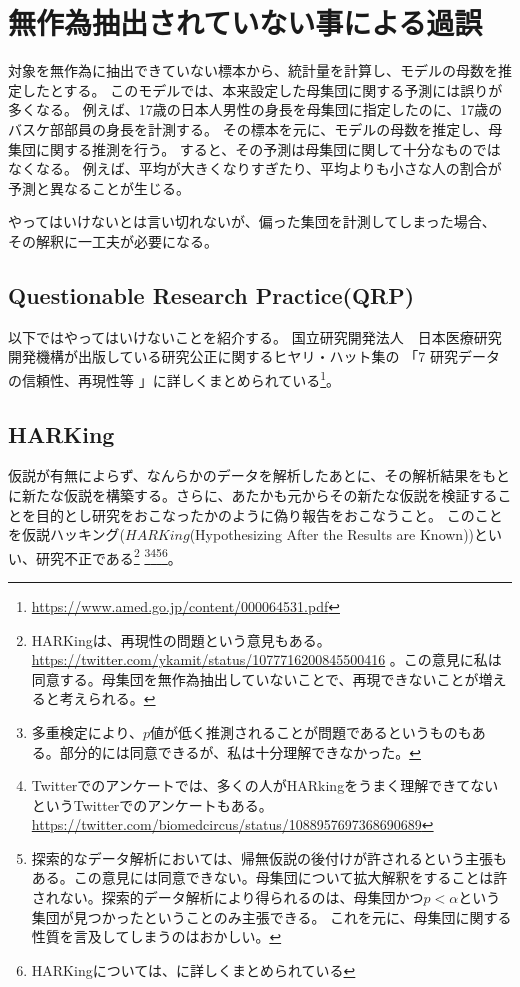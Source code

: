 \section{無作為抽出されていない事による過誤}
対象を無作為に抽出できていない標本から、統計量を計算し、モデルの母数を推定したとする。
このモデルでは、本来設定した母集団に関する予測には誤りが多くなる。
例えば、17歳の日本人男性の身長を母集団に指定したのに、17歳のバスケ部部員の身長を計測する。
その標本を元に、モデルの母数を推定し、母集団に関する推測を行う。
すると、その予測は母集団に関して十分なものではなくなる。
例えば、平均が大きくなりすぎたり、平均よりも小さな人の割合が予測と異なることが生じる。

やってはいけないとは言い切れないが、偏った集団を計測してしまった場合、
その解釈に一工夫が必要になる。


\subsection{Questionable Research Practice(QRP)}
以下ではやってはいけないことを紹介する。
国立研究開発法人　日本医療研究開発機構が出版している研究公正に関するヒヤリ・ハット集の
「7 研究データの信頼性、再現性等 」に詳しくまとめられている\footnote{\url{https://www.amed.go.jp/content/000064531.pdf}}。
\subsection{HARKing}
仮説が有無によらず、なんらかのデータを解析したあとに、その解析結果をもとに新たな仮説を構築する。さらに、あたかも元からその新たな仮説を検証することを目的とし研究をおこなったかのように偽り報告をおこなうこと。
このことを仮説ハッキング($HARKing$(Hypothesizing After the Results are Known))といい、研究不正である\footnote{
    HARKingは、再現性の問題という意見もある。
    \url{https://twitter.com/ykamit/status/1077716200845500416} 。この意見に私は同意する。母集団を無作為抽出していないことで、再現できないことが増えると考えられる。
}
\footnote{
    多重検定により、$p$値が低く推測されることが問題であるというものもある\cite{池田_功毅2016,中村_大輝2021sp20016}。部分的には同意できるが、私は十分理解できなかった。
}\footnote{
    Twitterでのアンケートでは、多くの人がHARkingをうまく理解できてないというTwitterでのアンケートもある。
    \url{https://twitter.com/biomedcircus/status/1088957697368690689}
}\footnote{
    探索的なデータ解析においては、帰無仮説の後付けが許されるという主張もある。この意見には同意できない。母集団について拡大解釈をすることは許されない。探索的データ解析により得られるのは、母集団かつ$p<\alpha$という集団が見つかったということのみ主張できる。
    これを元に、母集団に関する性質を言及してしまうのはおかしい。
}\footnote{
    HARKingについては、\cite{kerr1998harking}に詳しくまとめられている
}。

